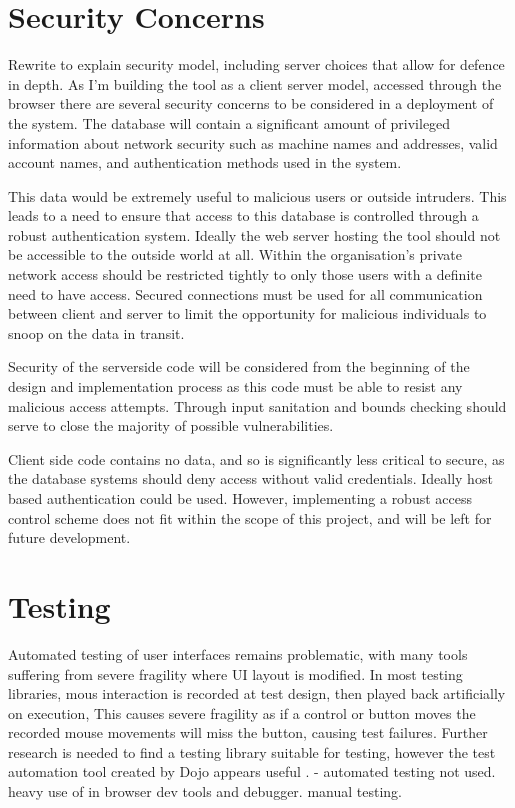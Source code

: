 \section{Security Concerns}
Rewrite to explain security model, including server choices that allow for defence in depth.
As I'm building the tool as a client server model, accessed through the browser
there are several security concerns to be considered in a deployment of the system.
The database will contain a significant amount of privileged information about network security
such as machine names and addresses, valid account names, and authentication methods used in the system.

This data would be extremely useful to malicious users or outside intruders. 
This leads to a need to ensure that access to this database is controlled through a robust authentication system.
Ideally the web server hosting the tool should not be accessible to the outside world at all. Within the organisation's private network access should be restricted tightly to only those users with a definite need to have access. 
Secured connections must be used for all communication between client and server to limit the opportunity for malicious individuals to snoop on the data in transit.

Security of the serverside code will be considered from the beginning of the design and implementation process
as this code must be able to resist any malicious access attempts. Through input sanitation and bounds checking should serve to close the majority of possible vulnerabilities.

Client side code contains no data, and so is significantly less critical to secure, as the database systems should deny access without valid credentials. Ideally host based authentication could be used. However, implementing a robust access control scheme does not fit within the scope of this project, and will be left for future development.


\section{Testing}
Automated testing of user interfaces remains problematic, with many tools suffering from severe fragility where UI layout is modified. In most testing libraries, mous interaction is recorded at test design, then played back artificially on execution, This causes severe fragility as if a control or button moves the recorded mouse movements will miss the button, causing test failures. Further research is needed to find a testing library suitable for testing, however the test automation tool created by Dojo appears useful \cite{dojo2013test}. - automated testing not used. heavy use of in browser dev tools and debugger. manual testing. 

